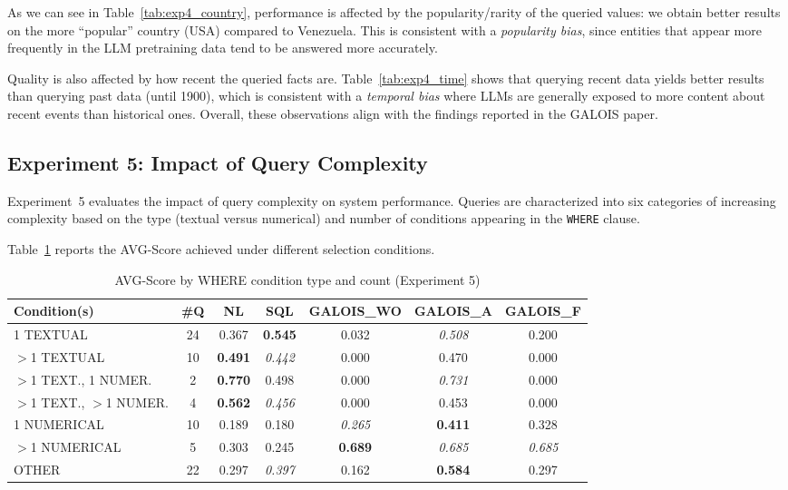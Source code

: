 \documentclass[11pt]{article}
\begin{document}
As we can see in Table~\ref{tab:exp4_country}, performance is affected by the popularity/rarity of the queried values: we obtain better results on the more ``popular'' country (USA) compared to Venezuela.
This is consistent with a \emph{popularity bias}, since entities that appear more frequently in the LLM pretraining data tend to be answered more accurately.

Quality is also affected by how recent the queried facts are.
Table~\ref{tab:exp4_time} shows that querying recent data yields better results than querying past data (until 1900), which is consistent with a \emph{temporal bias} where LLMs are generally exposed to more content about recent events than historical ones.
Overall, these observations align with the findings reported in the GALOIS paper.

\subsection{Experiment 5: Impact of Query Complexity}

Experiment~5 evaluates the impact of query complexity on system performance.
Queries are characterized into six categories of increasing complexity based on the type (textual versus numerical) and number of conditions appearing in the \texttt{WHERE} clause.

Table~\ref{tab:exp5_where_conditions} reports the AVG-Score achieved under different selection conditions.

\begin{table}[H]
\centering
\caption{AVG-Score by WHERE condition type and count (Experiment 5)}
\label{tab:exp5_where_conditions}
\begin{tabular}{lcccccc}
\hline
Condition(s) & \#Q & NL & SQL & GALOIS\_WO & GALOIS\_A & GALOIS\_F \\
\hline
1 TEXTUAL
& 24
& 0.367
& \textbf{0.545}
& 0.032
& \textit{0.508}
& 0.200 \\

$>$1 TEXTUAL
& 10
& \textbf{0.491}
& \textit{0.442}
& 0.000
& 0.470
& 0.000 \\

$>$1 TEXT., 1 NUMER.
& 2
& \textbf{0.770}
& 0.498
& 0.000
& \textit{0.731}
& 0.000 \\

$>$1 TEXT., $>$1 NUMER.
& 4
& \textbf{0.562}
& \textit{0.456}
& 0.000
& 0.453
& 0.000 \\

1 NUMERICAL
& 10
& 0.189
& 0.180
& \textit{0.265}
& \textbf{0.411}
& 0.328 \\

$>$1 NUMERICAL
& 5
& 0.303
& 0.245
& \textbf{0.689}
& \textit{0.685}
& \textit{0.685} \\

OTHER
& 22
& 0.297
& \textit{0.397}
& 0.162
& \textbf{0.584}
& 0.297 \\

\hline
\end{tabular}
\end{table}
\end{document}
